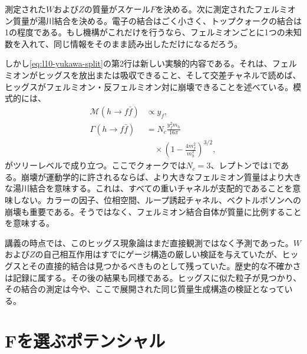 測定された\(W\)および\(Z\)の質量がスケール\(F\)を決める。次に測定されたフェルミオン質量が湯川結合を決める。電子の結合はごく小さく、トップクォークの結合は1の程度である。もし機構がこれだけを行うなら、フェルミオンごとに1つの未知数を入れて、同じ情報をそのまま読み出しただけになるだろう。

しかし\eqref{eq:l10-yukawa-split}の第2行は新しい実験的内容である。それは、フェルミオンがヒッグスを放出または吸収できること、そして交差チャネルで読めば、ヒッグスがフェルミオン・反フェルミオン対に崩壊できることを述べている。模式的には、
\begin{equation}
\begin{aligned}
  \mathcal M(h\to f\bar f)&\propto y_f,
  \\
  \Gamma(h\to f\bar f)
  &=
  N_c\frac{y_f^2m_h}{16\pi}
  \\
  &\quad\times
  \left(1-\frac{4m_f^2}{m_h^2}\right)^{3/2},
\end{aligned}
  \label{eq:l10-higgs-fermion-width}
\end{equation}
がツリーレベルで成り立つ。ここでクォークでは\(N_c=3\)、レプトンでは\(1\)である。崩壊が運動学的に許されるならば、より大きなフェルミオン質量はより大きな湯川結合を意味する。これは、すべての重いチャネルが支配的であることを意味しない。カラーの因子、位相空間、ループ誘起チャネル、ベクトルボソンへの崩壊も重要である。そうではなく、フェルミオン結合自体が質量に比例することを意味する。

\begin{classroomqa}
\end{classroomqa}

講義の時点では、このヒッグス現象論はまだ直接観測ではなく予測であった。\(W\)および\(Z\)の自己相互作用はすでにゲージ構造の厳しい検証を与えていたが、ヒッグスとその直接的結合は見つかるべきものとして残っていた。歴史的な不確かさは記録に属する。その後の結果も同様である。ヒッグスに似た粒子が見つかり、その結合の測定は今や、ここで展開された同じ質量生成構造の検証となっている。

\section{Fを選ぶポテンシャル}

